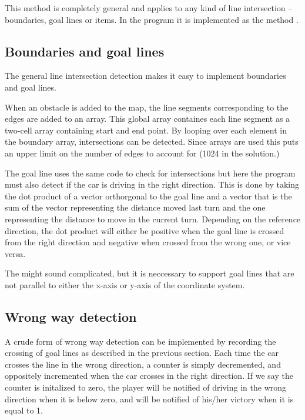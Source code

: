 This method is completely general and applies to any kind of line intersection
-- boundaries, goal lines or items. In the program it is implemented as the
method .

\subsection*{Boundaries and goal lines}

The general line intersection detection makes it easy to implement boundaries
and goal lines.

When an obstacle is added to the map, the line segments corresponding to the
edges are added to an array. This global array containes each line segment as
a two-cell array containing start and end point. By looping over each element
in the boundary array, intersections can be detected. Since arrays are used
this puts an upper limit on the number of edges to account for (1024 in the
solution.)

The goal line uses the same code to check for intersections but here the
program must also detect if the car is driving in the right direction.
This is done by taking the dot product of a vector orthorgonal to
the goal line and a vector that is the sum of the vector representing
the distance moved last turn and the one representing the distance to move
in the current turn. Depending on the reference direction, the dot product
will either be positive when the goal line is crossed from the right direction
and negative when crossed from the wrong one, or vice versa.

The might sound complicated, but it is neccessary to support goal lines
that are not parallel to either the x-axis or y-axis of the coordinate system.

\subsection*{Wrong way detection}
A crude form of wrong way detection can be implemented by recording
the crossing of goal lines as described in the previous section.
Each time the car crosses the line in the wrong direction, a counter
is simply decremented, and oppositely incremented when the car crosses
in the right direction. If we say the counter is initalized to zero, the player
will be notified of driving in the wrong direction when it is below zero, and
will be notified of his/her victory when it is equal to 1.

